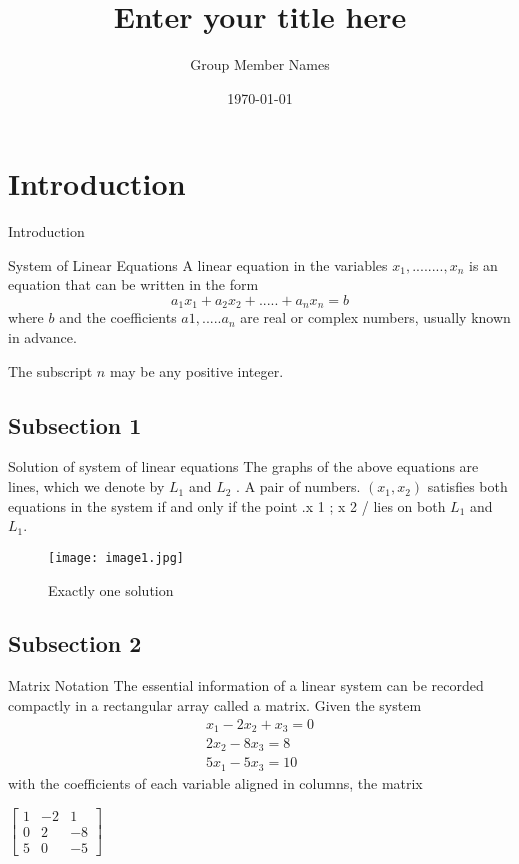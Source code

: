 \documentclass[11pt]{beamer}
\author{Group Member Names}
\title{Enter your title here}
\institute{Indian Institute of Information Technology, Allahabad}
\date{\today}
\begin{document}
\begin{frame}
\titlepage
\end{frame}


\section{Introduction}
\begin{frame}{Introduction}
\begin{block}{System of Linear Equations \cite{lay}}
\justifying
A linear equation in the variables $x_{1},........,x_{n}$ is an equation that can be written in the form 
\begin{equation}
   a_{1}x_{1} + a_{2}x_{2} + ..... + a_{n}x_{n} = b 
\end{equation}
where $b$ and the coefficients $a{1},.....a_{n}$ are real or complex numbers, usually known
in advance. 
\end{block}
The subscript $n$ may be any positive integer.
\end{frame}


\subsection{Subsection 1}
\begin{frame}{Solution of system of linear equations}
\justifying
The graphs of the above equations are lines, which we denote by $L_{1}$ and $L_{2}$ . A pair of numbers. $(x_{1}, x_{2})$  satisfies both equations in the system if and only if the point .x 1 ; x 2 / lies on both $L_{1}$ and $L_{1}$.

\begin{figure}
    \centering
    \texttt{[image: image1.jpg]}
    \caption{Exactly one solution}
    \label{fig:my_label}
\end{figure}
\end{frame}



\subsection{Subsection 2}
\begin{frame}{Matrix Notation}
The essential information of a linear system can be recorded compactly in a rectangular
array called a matrix. Given the system
\[\begin{array}{c}
x_{1}-2x_{2}+x_{3}=0 \\
2x_{2}-8x_{3} = 8  \\
5x_{1}-5x_{3}=10
\end{array}\]
\pause
with the coefficients of each variable aligned in columns, the matrix \\
\begin{center}
    $\begin{bmatrix}
1 & -2 & 1\\
0 & 2 & -8\\
5 & 0 & -5
\end{bmatrix}$
\end{center}
\end{frame}
\end{document}
